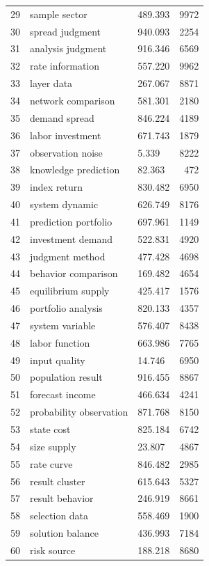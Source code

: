 \documentclass[11pt]{report}
\begin{document}
\begin{longtable}{rllr}
29 & sample sector & 489.393 & 9972 \\
30 & spread judgment & 940.093 & 2254 \\
31 & analysis judgment & 916.346 & 6569 \\
32 & rate information & 557.220 & 9962 \\
33 & layer data & 267.067 & 8871 \\
34 & network comparison & 581.301 & 2180 \\
35 & demand spread & 846.224 & 4189 \\
36 & labor investment & 671.743 & 1879 \\
37 & observation noise & 5.339 & 8222 \\
38 & knowledge prediction & 82.363 & 472 \\
39 & index return & 830.482 & 6950 \\
40 & system dynamic & 626.749 & 8176 \\
41 & prediction portfolio & 697.961 & 1149 \\
42 & investment demand & 522.831 & 4920 \\
43 & judgment method & 477.428 & 4698 \\
44 & behavior comparison & 169.482 & 4654 \\
45 & equilibrium supply & 425.417 & 1576 \\
46 & portfolio analysis & 820.133 & 4357 \\
47 & system variable & 576.407 & 8438 \\
48 & labor function & 663.986 & 7765 \\
49 & input quality & 14.746 & 6950 \\
50 & population result & 916.455 & 8867 \\
51 & forecast income & 466.634 & 4241 \\
52 & probability observation & 871.768 & 8150 \\
53 & state cost & 825.184 & 6742 \\
54 & size supply & 23.807 & 4867 \\
55 & rate curve & 846.482 & 2985 \\
56 & result cluster & 615.643 & 5327 \\
57 & result behavior & 246.919 & 8661 \\
58 & selection data & 558.469 & 1900 \\
59 & solution balance & 436.993 & 7184 \\
60 & risk source & 188.218 & 8680 \\
\end{longtable}
\end{document}

